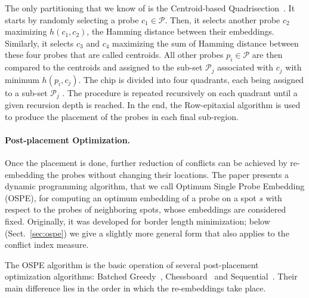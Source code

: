 \documentclass{llncs}
\newcommand{\ignore}[1]{}
\begin{document}
The only partitioning that we know of is the Centroid-based
Quadrisection~\cite{KAHNG03B}. It starts by randomly selecting a probe
$c_1 \in \mathcal{P}$. Then, it selects another probe $c_2$ maximizing
$h(c_1,c_2)$, the Hamming distance between their embeddings. Similarly, it
selects $c_3$ and $c_4$ maximizing the sum of Hamming distance between these
four probes that are called centroids. All other probes $p_i \in \mathcal{P}$
are then compared to the centroids and assigned to the sub-set $\mathcal{P}_j$
associated with $c_j$ with minimum $h(p_i,c_j)$. The chip is divided into four
quadrants, each being assigned to a sub-set $\mathcal{P}_j$ .  The procedure
is repeated recursively on each quadrant until a given recursion depth is
reached. In the end, the Row-epitaxial algorithm is used to produce the
placement of the probes in each final sub-region.


\paragraph{Post-placement Optimization.}
Once the placement is done, further reduction of conflicts can be achieved by
re-embedding the probes without changing their locations.  The paper
\cite{KAHNG02} presents a dynamic programming algorithm, that we call Optimum
Single Probe Embedding (OSPE), for computing an optimum embedding of a probe
on a spot $s$ with respect to the probes of neighboring spots, whose
embeddings are considered fixed.  Originally, it was developed for border
length minimization; below (Sect.~\ref{sec:ospe}) we give a slightly more
general form that also applies to the conflict index measure.

The OSPE algorithm is the basic operation of several post-placement
optimization algorithms: Batched Greedy~\cite{KAHNG02},
Chessboard~\cite{KAHNG02} and Sequential~\cite{KAHNG03B}. Their main
difference lies in the order in which the re-embeddings take place.

\ignore{ The first algorithm is a simple greedy approach that computes, for
  each spot of the chip, the maximum reduction of conflicts that could be
  achieved by re-embedding its probe with the OSPE algorithm. It then greedily
  selects the spot with higher gain and re-embeds its probe optimally with
  respect to its neighbors, updating the gains of affected spots. A faster
  version, called Batched Greedy, sacrifices its greedy nature by postponing
  the update of gains and re-embedding all probes that have not been affected
  by the re-embeddings performed in the current iteration.
  
  The Chessboard optimization is based on the fact that a chip can be
  bi-colored just like a chessboard, in such a way that the embeddings of
  probes located on white spots, with respect to border length, are
  independent of those placed on black spots, and vice-versa. The Chessboard
  uses this coloring to alternate the optimal re-embedding of probes located
  on black and white spots.%
}
\end{document}
